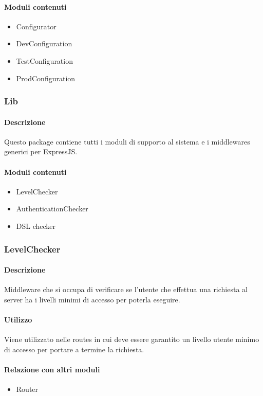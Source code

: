 \paragraph*{Moduli contenuti}
\begin{itemize}
\item Configurator
\item DevConfiguration
\item TestConfiguration
\item ProdConfiguration
\end{itemize}

\subsubsection{Lib}
\paragraph*{Descrizione}
Questo package contiene tutti i moduli di supporto al sistema e i middlewares generici per ExpressJS.

\paragraph*{Moduli contenuti}
\begin{itemize}
\item LevelChecker
\item AuthenticationChecker
\item DSL checker
\end{itemize}

\subsubsection{LevelChecker}
\paragraph*{Descrizione}
Middleware che si occupa di verificare se l'utente che effettua una richiesta al server ha i livelli minimi di accesso per poterla eseguire.

\paragraph*{Utilizzo}
Viene utilizzato nelle routes in cui deve essere garantito un livello utente minimo di accesso per portare a termine la richiesta.

\paragraph*{Relazione con altri moduli}
\begin{itemize}
\item Router
\end{itemize}

